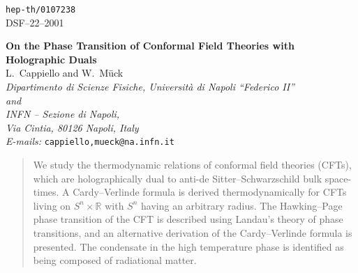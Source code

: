\documentclass[a4paper,12pt]{article}
\begin{document}
\providecommand{\V}{\mathcal{V}}
\providecommand{\rh}{\hat{r}}

\begin{titlepage}

\begin{flushright}
                             \texttt{hep-th/0107238}\\
                             DSF--22--2001
\end{flushright}
\vspace{1.5cm}

\begin{center}
\renewcommand{\baselinestretch}{1.8}\normalsize
\textbf{\LARGE On the Phase Transition of Conformal Field Theories
with Holographic Duals}\\[1.5cm]

{\large L.~Cappiello and W.~M{\"{u}}ck}\\[0.5cm]

\renewcommand{\baselinestretch}{1.2}\normalsize
\emph{Dipartimento di Scienze Fisiche, Universit\`{a} di Napoli
``Federico II''}\\
\emph{and}\\
\emph{INFN -- Sezione di Napoli,}\\
\emph{Via Cintia, 80126 Napoli, Italy}\\[12pt]
\emph{E-mails:} \texttt{cappiello,mueck@na.infn.it}\\[1.5cm]
\end{center}

\begin{abstract}
We study the thermodynamic relations of conformal field theories
(CFTs), which are holographically dual to anti-de
Sitter--Schwarzschild bulk space-times.
A Cardy--Verlinde formula is derived thermodynamically for
CFTs living on $S^n{\times} \mathbb{R}$ with $S^n$ having an arbitrary
radius. The Hawking--Page phase transition of the CFT is described
using Landau's theory of phase transitions, and an alternative
derivation of the Cardy--Verlinde formula is presented. The condensate
in the high temperature phase is identified as being composed of
radiational matter.
\end{abstract}
\end{titlepage}
\end{document}
